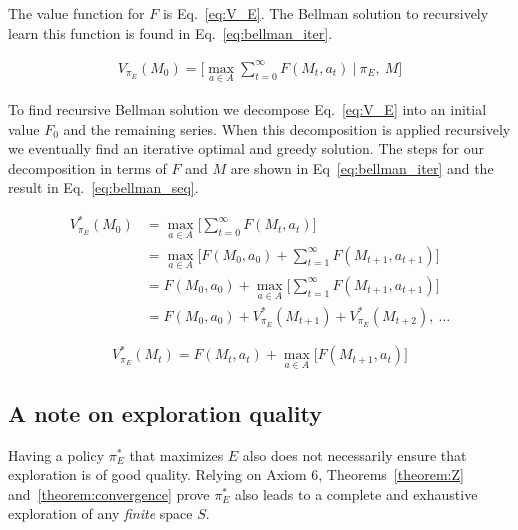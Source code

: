 \documentclass[10pt,letterpaper]{article}
\begin{document}
\noindent
The value function for $F$ is Eq.~\ref{eq:V_E}. The Bellman solution to recursively learn this function is found in Eq.~\ref{eq:bellman_iter}. 

\begin{equation} \label{eq:V_E}
    \begin{split}
        V_{\pi_E}(M_0) = \Big [ \max_{a \in A} \sum_{t=0}^{\infty} F(M_t, a_t) \ \Big | \ \pi_E, \ M \Big ]
    \end{split}
\end{equation}

To find recursive Bellman solution we decompose Eq.~\ref{eq:V_E} into an initial value $F_0$ and the remaining series. When this decomposition is applied recursively we eventually find an iterative optimal and greedy solution. The steps for our decomposition in terms of $F$ and $M$ are shown in Eq~\ref{eq:bellman_iter} and the result in Eq.~\ref{eq:bellman_seq}.

\begin{equation} \label{eq:bellman_seq}
    \begin{split}
        V^*_{\pi_E}(M_0) &= \max_{a \in A} \Big [\sum_{t=0}^{\infty} F(M_t, a_t)\Big ]\\
                         &= \max_{a \in A} \Big [F(M_0, a_0) + \sum^{\infty}_{t=1} F(M_{t+1}, a_{t+1})\Big ]\\
                         &= F(M_0, a_0) + \max_{a \in A} \Big [\sum_{t=1}^{\infty} F(M_{t+1}, a_{t+1}) \Big ]\\
                         &= F(M_0, a_0) + V^*_{\pi_E}(M_{t+1}) + V^*_{\pi_E}(M_{t+2}),\ \ldots
    \end{split}
\end{equation}

\begin{equation} 
\label{eq:bellman_iter}
    V^*_{\pi_E}(M_{t}) = F(M_{t}, a_{t}) + \max_{a \in A} \Big [ F(M_{t+1}, a_t) \Big ]
\end{equation}

\subsection{A note on exploration quality}
Having a policy $\pi^*_E$ that maximizes $E$ also does not necessarily ensure that exploration is of good quality. Relying on Axiom 6, Theorems~\ref{theorem:Z} and~\ref{theorem:convergence} prove $\pi^*_E$ also leads to a complete and exhaustive exploration of any \textit{finite} space $S$.
\end{document}
